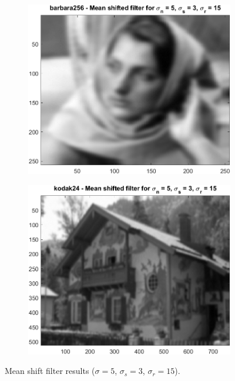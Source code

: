 \documentclass{article}
\begin{document}
\begin{figure}[H]
    \centering
    \begin{subfigure}[b]{0.45\textwidth}
        \includegraphics[width=\textwidth]{../images/barbara_5_3_15.png}
    \end{subfigure}
    \begin{subfigure}[b]{0.45\textwidth}
        \includegraphics[width=\textwidth]{../images/kodak_5_3_15.png}
    \end{subfigure}
    \caption{Mean shift filter results ($\sigma = 5$, $\sigma_s = 3$, $\sigma_r = 15$).}
\end{figure}
\end{document}
